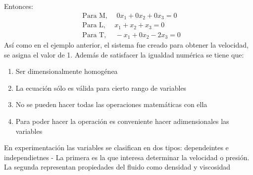 Entonces:
\begin{align*}
    &\text{Para M, }\quad 0x_1+ 0x_2+ 0x_3 =0\\
    &\text{Para L, }\quad x_1+ x_2+ x_3 = 0\\
    &\text{Para T, }\quad -x_1+ 0x_2 - 2x_3 =0
\end{align*}
Así como en el ejemplo anterior, el sistema fue creado para obtener la velocidad, se asigna el valor de 1. Además de satisfacer la igualdad numérica se tiene que:
\begin{enumerate}
    \item Ser dimensionalmente homogénea
    \item La ecuación sólo es válida para cierto rango de variables
    \item No se pueden hacer todas las operaciones matemáticas con ella
    \item Para poder hacer la operación es conveniente hacer adimensionales las variables
\end{enumerate}

En experimentación las variables se clasifican en dos tipos: dependeintes e independietnes - La primera es la que interesa determinar la velocidad o presión. La segunda representan propiedades del fluido como densidad y viscosidad


